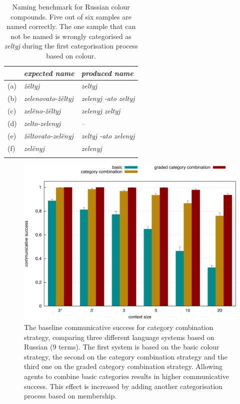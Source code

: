 \begin{table}[htpb]
  \centering
  \begin{tabular}{l>{\itshape}l>{\itshape}l}
  \lsptoprule
    & \normalfont expected name & \normalfont produced name \\
    \midrule
    (a) & \v z\"eltyj & zeltyj \\
    (b) & zelenovato-\v z\"eltyj  & zelenyj -ato zeltyj \\
    (c) & zel\"eno-\v z\"eltyj & zelenyj zeltyj \\
    (d) & zelto-zelenyj & \normalfont -- \\
    (e) & \v z\"eltovato-zel\"enyj & zeltyj -ato zelenyj \\
    (f) & zel\"enyj & zelenyj \\
    \lspbottomrule
  \end{tabular}
  \caption[Naming benchmark for Russian colour compounds]{Naming benchmark for Russian colour compounds. Five out of six samples are named correctly. The one sample that can not be named is wrongly categorised as \textit{zeltyj} during the first categorisation process based on colour.}
  \label{t:ccs-russian-naming-benchmark}
\end{table}

\begin{figure}[p]
  \centering
  \includegraphics[width=.8\textwidth]{./category-combination/figures/baseline.pdf}
  \caption[The baseline communicative success for category combination
  strategy]{The baseline communicative success for category
    combination strategy, comparing three different language systems
    based on Russian (9 terms). The first system is based on the basic
    colour strategy, the second on the category combination strategy
    and the third one on the graded category combination
    strategy. Allowing agents to combine basic categories results in
    higher communicative success. This effect is increased by adding
    another categorisation process based on membership.}
  \label{f:ccs-baseline}
\end{figure}

